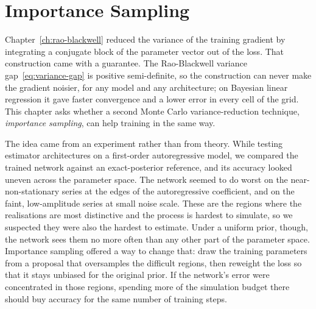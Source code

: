 \chapter{Importance Sampling}
\label{ch:importance-sampling}

Chapter~\ref{ch:rao-blackwell} reduced the variance of the training
gradient by integrating a conjugate block of the parameter vector out
of the loss. That construction came with a guarantee. The
Rao-Blackwell variance gap~\eqref{eq:variance-gap} is positive
semi-definite, so the construction can never make the gradient noisier,
for any model and any architecture; on Bayesian linear regression it
gave faster convergence and a lower error in every cell of the grid.
This chapter asks whether a second Monte Carlo variance-reduction
technique, \emph{importance sampling}, can help training in the same
way.

The idea came from an experiment rather than from theory. While testing
estimator architectures on a first-order autoregressive model, we
compared the trained network against an exact-posterior reference, and
its accuracy looked uneven across the parameter space. The network
seemed to do worst on the near-non-stationary series at the edges of
the autoregressive coefficient, and on the faint, low-amplitude series
at small noise scale. These are the regions where the realisations are
most distinctive and the process is hardest to simulate, so we suspected
they were also the hardest to estimate. Under a uniform prior, though,
the network sees them no more often than any other part of the
parameter space. Importance sampling offered a way to change that: draw
the training parameters from a proposal that oversamples the difficult
regions, then reweight the loss so that it stays unbiased for the
original prior. If the network's error were concentrated in those
regions, spending more of the simulation budget there should buy
accuracy for the same number of training steps.

